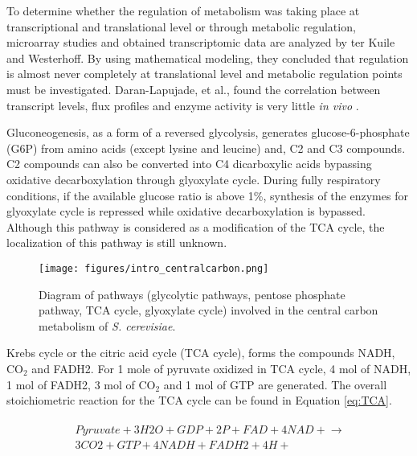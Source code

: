 To determine whether the regulation of metabolism was taking place at transcriptional and translational level or through metabolic regulation, microarray studies and obtained transcriptomic data are analyzed by ter Kuile and Westerhoff\cite{ter2001transcriptome}. By using mathematical modeling, they concluded that regulation is almost never completely at translational level and metabolic regulation points must be investigated. Daran-Lapujade, et al., found the correlation between transcript levels, flux profiles and enzyme activity is very little \emph{in vivo} \cite{daran2004role}.

Gluconeogenesis, as a form of a reversed glycolysis, generates glucose-6-phosphate (G6P) from amino acids (except lysine and leucine) and, C2 and C3 compounds. C2 compounds can also be converted into C4 dicarboxylic acids bypassing oxidative decarboxylation through glyoxylate cycle. During fully respiratory conditions, if the available glucose ratio is above 1\%, synthesis of the enzymes for glyoxylate cycle is repressed while oxidative decarboxylation is bypassed. Although this pathway is considered as a modification of the TCA cycle, the localization of this pathway is still unknown.

\begin{figure}[H]
\texttt{[image: figures/intro\_centralcarbon.png]}
\caption[Diagram of pathways (glycolytic pathways, pentose phosphate pathway, TCA cycle, glyoxylate cycle) involved in the central carbon metabolism of \emph{S. cerevisiae}]{Diagram of pathways (glycolytic pathways, pentose phosphate pathway, TCA cycle, glyoxylate cycle) involved in the central carbon metabolism of \emph{S. cerevisiae}.}
\label{fig:intro_centralcarbon}
\end{figure}

Krebs cycle or the citric acid cycle (TCA cycle), forms the compounds NADH, CO$_2$ and FADH2. For 1 mole of pyruvate oxidized in TCA cycle, 4 mol of NADH, 1 mol of FADH2, 3 mol of CO$_2$ and 1 mol of GTP are generated. The overall stoichiometric reaction for the TCA cycle can be found in Equation \ref{eq:TCA}.

\begin{align}
  \begin{split}
  \label{eq:TCA}
  \ Pyruvate + 3 H2O + GDP + 2 P + FAD + 4 NAD+ \xrightarrow{} \\
  \ 3 CO2 + GTP + 4 NADH + FADH2 + 4 H+
  \end{split}
\end{align}

